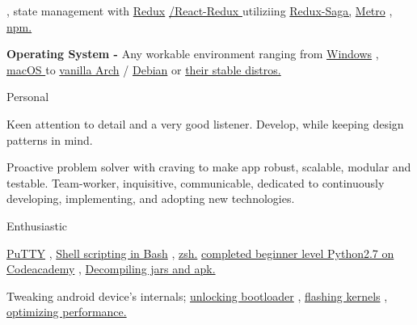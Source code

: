 \begin{skillsentries}
{\begin{skillsitems}
{        , state management with 
        {\href{https://redux.js.org}{Redux}}
        {\href{https://react-redux.js.org}{/React-Redux }}
        utiliziing 
        {\href{https://redux-saga.js.org}{Redux-Saga,}} 
        {\href{https://github.com/facebook/metro}{Metro}}
        ,
         {\href{https://www.npmjs.com}{npm.}}}
        \item {\textbf{Operating System - } Any workable environment ranging from 
        {\href{https://www.microsoft.com/en-us/windows}{Windows}}
        , 
        {\href{https://www.apple.com/lae/macos/mojave/}{macOS }}
        to  
        {\href{https://www.archlinux.org}{vanilla Arch}}
        /
        {\href{https://www.debian.org}{Debian}} 
        or 
        {\href{https://distrowatch.com}{their stable distros.}}}
      \end{skillsitems}
    }

    
    \skillsentry
    {Personal} %
    {
      \begin{skillsitems} %
        \item {Keen attention to detail and a very good listener. Develop, while keeping design patterns in mind.}
        \item {Proactive problem solver with craving to make app robust, scalable, modular and testable. Team-worker, inquisitive, communicable, 
        dedicated to continuously developing, implementing, and adopting new technologies.}
      \end{skillsitems}
      }
      
      \skillsentry
      {Enthusiastic} %
      {
        \begin{skillsitems} %
          \item {{\href{https://www.putty.org}{PuTTY}}
          , 
          {\href{https://en.wikibooks.org/wiki/Bash_Shell_Scripting}{Shell scripting in Bash}}
          ,  
          {\href{http://zsh.sourceforge.net}{zsh.}} 
          {\href{https://www.codecademy.com/learn}{completed beginner level Python2.7 on Codeacademy}}
          , 
          {\href{https://www.xda-developers.com/decompile-and-modify-apks-on-the-go-with-apktool-for-android/}{Decompiling jars and apk.}}}
          \item {Tweaking android device's internals; 
          {\href{https://forum.xda-developers.com/wiki/Bootloader}{unlocking bootloader}}
          , 
          {\href{https://forum.xda-developers.com/google-nexus-5/development\#kernels}{flashing kernels}}
          , 
          {\href{https://forum.xda-developers.com/google-nexus-5/general/android-toolkit-t2690032}{optimizing performance.}}}
        \end{skillsitems}
      }
\end{skillsentries}
